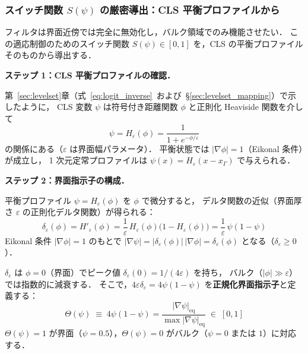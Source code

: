 \subsubsection{スイッチ関数 $S(\psi)$ の厳密導出：CLS 平衡プロファイルから}
\label{sec:dccd_switch}

フィルタは界面近傍では完全に無効化し，バルク領域でのみ機能させたい．
この適応制御のためのスイッチ関数 $S(\psi) \in [0,1]$ を，CLS の平衡プロファイルそのものから導出する．

\medskip
\noindent\textbf{ステップ 1：CLS 平衡プロファイルの確認．}

第~\ref{sec:levelset}章（式~\eqref{eq:logit_inverse}~および~§\ref{sec:levelset_mapping}）で示したように，
CLS 変数 $\psi$ は符号付き距離関数 $\phi$ と正則化 Heaviside 関数を介して
\begin{equation}
  \psi = H_\varepsilon(\phi) = \frac{1}{1+e^{-\phi/\varepsilon}}
  \label{eq:cls_equilibrium}
\end{equation}
の関係にある（$\varepsilon$ は界面幅パラメータ）．
平衡状態では $|\nabla\phi| = 1$（Eikonal 条件）が成立し，
1 次元定常プロファイルは $\psi(x) = H_\varepsilon(x - x_\Gamma)$ で与えられる．

\medskip
\noindent\textbf{ステップ 2：界面指示子の構成．}

平衡プロファイル $\psi = H_\varepsilon(\phi)$ を $\phi$ で微分すると，
デルタ関数の近似（界面厚さ $\varepsilon$ の正則化デルタ関数）が得られる：
\begin{equation}
  \delta_\varepsilon(\phi)
  = H'_\varepsilon(\phi)
  = \frac{1}{\varepsilon}\,H_\varepsilon(\phi)\bigl(1 - H_\varepsilon(\phi)\bigr)
  = \frac{1}{\varepsilon}\,\psi(1-\psi)
  \label{eq:delta_reg}
\end{equation}
Eikonal 条件 $|\nabla\phi| = 1$ のもとで $|\nabla\psi| = |\delta_\varepsilon(\phi)|\,|\nabla\phi| = \delta_\varepsilon(\phi)$ となる（$\delta_\varepsilon \geq 0$）．

$\delta_\varepsilon$ は $\phi = 0$（界面）でピーク値 $\delta_\varepsilon(0) = 1/(4\varepsilon)$ を持ち，
バルク（$|\phi| \gg \varepsilon$）では指数的に減衰する．
そこで，$4\varepsilon\delta_\varepsilon = 4\psi(1-\psi)$ を\textbf{正規化界面指示子}と定義する：
\begin{equation}
  \Theta(\psi) \;\equiv\; 4\psi(1-\psi) = \frac{|\nabla\psi|_{\mathrm{eq}}}{\max|\nabla\psi|_{\mathrm{eq}}} \;\in\; [0, 1]
  \label{eq:interface_indicator}
\end{equation}
$\Theta(\psi) = 1$ が界面（$\psi = 0.5$），$\Theta(\psi) = 0$ がバルク（$\psi = 0$ または $1$）に対応する．

